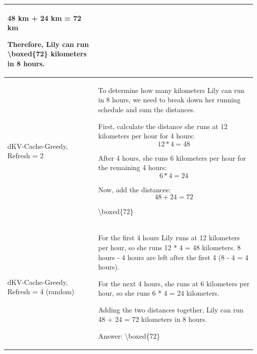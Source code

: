 \documentclass{article}
\newcommand{\mmethodname}{dKV-Cache-Greedy}
\begin{document}
\begin{table}[t]
\begin{tabular}{p{2cm}|p{10cm}}
   48 km + 24 km = 72 km

Therefore, Lily can run \textbackslash boxed\{72\} kilometers in 8 hours. \\ 
\midrule

\mmethodname, Refresh = 2 & To determine how many kilometers Lily can run in 8 hours, we need to break down her running schedule and sum the distances.

First, calculate the distance she runs at 12 kilometers per hour for 4 hours:
\[ 12 * 4 = 48\]

After 4 hours, she runs 6 kilometers per hour for the remaining 4 hours:
\[ 6 * 4 = 24\]

Now, add the distances:
\[ 48 + 24 = 72\]

\textbackslash boxed\{72\}  \\
\midrule
\mmethodname, Refresh = 4 (random) & For the first 4 hours Lily runs at 12 kilometers per hour, so she runs 12 * 4 = 48 kilometers.
 8 hours - 4 hours are left after the first 4 (8 - 4 = 4 hours).

For the next 4 hours, she runs at 6 kilometers per hour, so she runs 6 * 4 = 24 kilometers.

Adding the two distances together, Lily can run 48 + 24 = 72 kilometers in 8 hours.

Answer: \textbackslash boxed\{72\}  \\
   \bottomrule
    \end{tabular}
\end{table}
\end{document}
